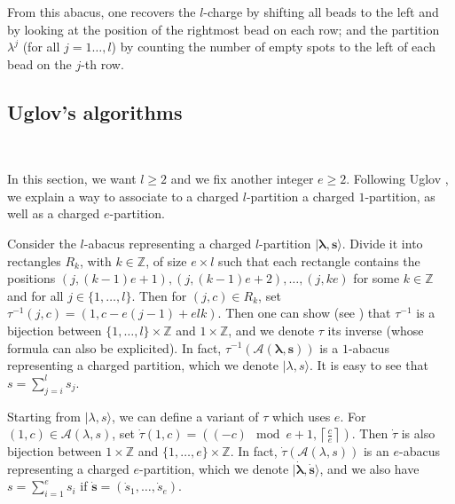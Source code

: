 \documentclass[twoside,12pt]{amsart}
\theoremstyle{plain}
\newcommand{\cA}{\mathcal{A}}
\newcommand{\Z}{\mathbb{Z}}
\newcommand{\bs}{\mathbf{s}}
\newcommand{\la}{\lambda}
\newcommand{\bla}{\boldsymbol{\la}}
\newcommand{\ds}{\dot{s}}
\newcommand{\dtau}{\dot{\tau}}
\newcommand{\dbs}{\dot{\bs}}
\newcommand{\dbla}{\dot{\bla}}
\theoremstyle{remark}
\begin{document}
From this abacus, one recovers 
the $l$-charge by shifting all beads to the left and by looking at the position of the rightmost bead on each row;
and the partition $\la^j$ (for all $j=1\dots,l$) by counting the number of empty spots to the left of each bead
on the $j$-th row.

\subsection{Uglov's algorithms}\label{uglovs_bij}\

In this section, we want $l\geq 2$ and we fix another integer $e\geq2$.
Following Uglov \cite{Uglov1999}, we explain a way to 
associate to a charged $l$-partition a charged $1$-partition, as well as a charged $e$-partition.

Consider the $l$-abacus representing a charged $l$-partition $|\bla,\bs\rangle$.
Divide it into rectangles $R_k$, with $k\in\Z$, of size $e\times l$ such that each rectangle contains the 
positions $(j,(k-1)e+1), (j,(k-1)e+2),\dots, (j,ke)$ for some $k\in\Z$ and for all $j\in\{1,\dots,l\}$.
Then for $(j,c)\in R_k$, set $\tau^{-1}(j,c) =(1, c-e(j-1)+elk)$.
Then one can show (see \cite{Uglov1999}) that $\tau^{-1}$ is a bijection between $\{1,\dots,l\}\times\Z$ and $1\times\Z$,
and we denote $\tau$ its inverse (whose formula can also be explicited).
In fact, $\tau^{-1}(\cA(\bla,\bs))$ is a $1$-abacus representing a charged partition, which we denote
$|\la,s\rangle$. It is easy to see that $s=\sum_{j=i}^ls_j$.

Starting from $|\la,s\rangle$, we can define a variant of $\tau$ which uses $e$.
For $(1,c)\in\cA(\la,s)$, set $\dtau(1,c)=((-c)\mod e+1 , \left\lceil \frac{c}{e} \right\rceil)$.
Then $\dtau$ is also bijection between $1\times\Z$ and $\{1,\dots,e\}\times\Z$.
In fact, $\dtau(\cA(\la,s))$ is an $e$-abacus representing a charged $e$-partition, which we denote
$|\dbla,\dbs\rangle$, and we also have $s=\sum_{i=1}^e s_i$ if $\dbs=(\ds_1,\dots,\ds_e)$.
\end{document}
